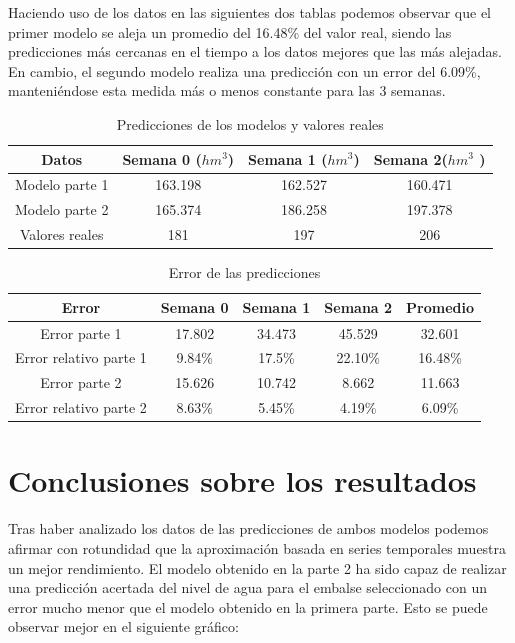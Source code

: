\documentclass[12pt]{report} %
\begin{document}
Haciendo uso de los datos en las siguientes dos tablas podemos observar que el primer modelo se aleja un promedio del 16.48\% del valor real, siendo las predicciones más cercanas en el tiempo a los datos mejores que las más alejadas. En cambio, el segundo modelo realiza una predicción con un error del 6.09\%, manteniéndose esta medida más o menos constante para las 3 semanas.

\begin{table}[H]
    \begin{tabular}{|c|c|c|c|}
    \hline
    Datos & Semana 0 ($hm^3$) & Semana 1 ($hm^3$)& Semana 2($hm^3$ )\\
    \hline
    \hline
    Modelo parte 1 & 163.198 & 162.527 & 160.471\\
    Modelo parte 2 & 165.374 & 186.258 & 197.378\\
    Valores reales & 181     & 197     & 206    \\
    \hline
    \end{tabular}
    \caption {Predicciones de los modelos y valores reales}
\end{table}

\begin{table}[H]
\begin{tabular}{|c|c|c|c|c|}
    \hline
    Error & Semana 0 & Semana 1 & Semana 2 & Promedio\\
    \hline
    \hline
    Error parte 1  &  17.802 &  34.473 &  45.529 & 32.601\\
    Error relativo parte 1   & 9.84\% & 17.5\% & 22.10\% & 16.48\%\\
    Error parte 2  &  15.626 &  10.742 &   8.662 & 11.663\\
    Error relativo parte 2   & 8.63\% & 5.45\% & 4.19\% & 6.09\%\\ 
    \hline
    \end{tabular}
    \caption {Error de las predicciones}
\end{table}

\section{Conclusiones sobre los resultados}

Tras haber analizado los datos de las predicciones de ambos modelos podemos afirmar con rotundidad que la aproximación basada en series temporales muestra un mejor rendimiento. El modelo obtenido en la parte 2 ha sido capaz de realizar una predicción acertada del nivel de agua para el embalse seleccionado con un error mucho menor que el modelo obtenido en la primera parte. Esto se puede observar mejor en el siguiente gráfico:
\end{document}
